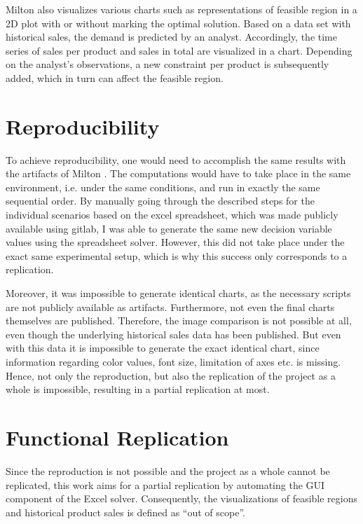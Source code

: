 \documentclass[sigconf, nonacm]{acmart}
\begin{document}
Milton \cite{Milton2009} also visualizes various charts such as representations of feasible region in a 2D plot with or without marking the optimal solution. Based on a data set with historical sales, the demand is predicted by an analyst. Accordingly, the time series of sales per product and sales in total are visualized in a chart. Depending on the analyst's observations, a new constraint per product is subsequently added, which in turn can affect the feasible region.



\section{Reproducibility}
To achieve reproducibility, one would need to accomplish the same results with the artifacts of Milton \cite{Milton2009}. The computations would have to take place in the same environment, i.e. under the same conditions, and run in exactly the same sequential order. By manually going through the described steps for the individual scenarios based on the excel spreadsheet, which was made publicly available using gitlab, I was able to generate the same new decision variable values using the spreadsheet solver. However, this did not take place under the exact same experimental setup, which is why this success only corresponds to a replication.


Moreover, it was impossible to generate identical charts, as the necessary scripts are not publicly available as artifacts. Furthermore, not even the final charts themselves are published. Therefore, the image comparison is not possible at all, even though the underlying historical sales data has been published. But even with this data it is impossible to generate the exact identical chart, since information regarding color values, font size, limitation of axes etc. is missing. Hence, not only the reproduction, but also the replication of the project as a whole is impossible, resulting in a partial replication at most.



\section{Functional Replication}
\label{sec:functional-replication}
Since the reproduction is not possible and the project as a whole cannot be replicated, this work aims for a partial replication by automating the GUI component of the Excel solver. Consequently, the visualizations of feasible regions and historical product sales is defined as ``out of scope''.
\end{document}
